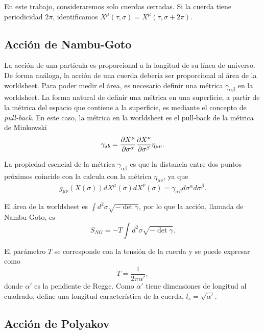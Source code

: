 En este trabajo, consideraremos solo cuerdas cerradas. 
Si la cuerda tiene periodicidad $2\pi$, identificamos $X^\mu(\tau,\sigma)=X^\mu(\tau,\sigma+2\pi)$.

\subsection{Acción de Nambu-Goto}

La acción de una partícula es proporcional a la longitud de su línea de universo.
De forma análoga, la acción de una cuerda debería ser proporcional al área de la
worldsheet.
Para poder medir el área, es necesario definir una métrica $\gamma_{\alpha\beta}$ en la worldsheet.
La forma natural de definir una métrica en una superficie, a partir de la métrica del espacio que
contiene a la superficie, es mediante el concepto de \emph{pull-back}.
En este caso, la métrica en la worldsheet es el pull-back de la métrica de Minkowski
\begin{equation}
  \gamma_{ab}=\pdv{X^\mu}{\sigma^\alpha}\pdv{X^\nu}{\sigma^\beta}\eta_{\mu\nu}.
\end{equation}

La propiedad esencial de la métrica $\gamma_{\alpha\beta}$ es que la distancia entre dos puntos próximos 
coincide con la calcula con la métrica $\eta_{\mu\nu}$, ya que
\begin{equation}
  g_{\mu\nu}(X(\sigma)) dX^\mu(\sigma)dX^\nu(\sigma) = \gamma_{\alpha\beta} d\sigma^\alpha d\sigma^\beta.
\end{equation}

El área de la worldsheet es $\int d^2\sigma \sqrt{-\det\gamma}$, por lo que la acción, llamada de Nambu-Goto, es
\begin{equation}
  S_{NG}=-T\int d^2\sigma \sqrt{-\det\gamma}.
\end{equation}

El parámetro $T$ se corresponde con la tensión de la cuerda y se puede expresar como
\begin{equation}
  T=\frac{1}{2\pi\alpha'},
\end{equation}
donde $\alpha'$ es la pendiente de Regge.
Como $\alpha'$ tiene dimensiones de longitud al cuadrado, define una longitud característica
de la cuerda, $l_s=\sqrt{\alpha'}$.

\subsection{Acción de Polyakov}

